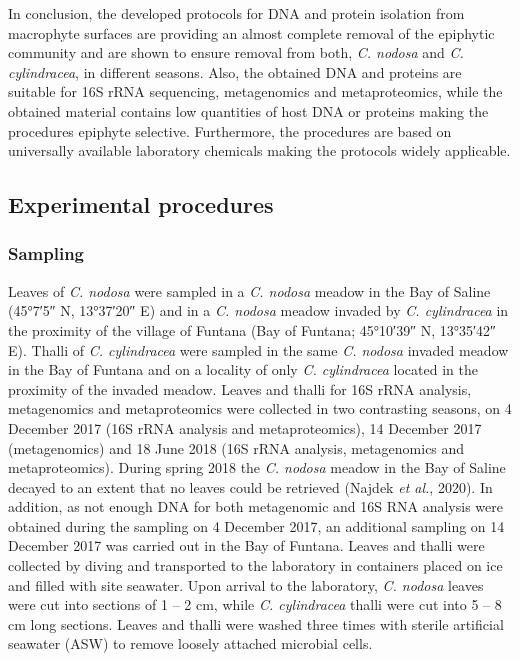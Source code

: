 \documentclass[
  12pt,
]{article}
\begin{document}
In conclusion, the developed protocols for DNA and protein isolation
from macrophyte surfaces are providing an almost complete removal of the
epiphytic community and are shown to ensure removal from both, \emph{C.
nodosa} and \emph{C. cylindracea}, in different seasons. Also, the
obtained DNA and proteins are suitable for 16S rRNA sequencing,
metagenomics and metaproteomics, while the obtained material contains
low quantities of host DNA or proteins making the procedures epiphyte
selective. Furthermore, the procedures are based on universally
available laboratory chemicals making the protocols widely applicable.

\newpage

\hypertarget{experimental-procedures}{%
\subsection{Experimental procedures}\label{experimental-procedures}}

\hypertarget{sampling}{%
\subsubsection{Sampling}\label{sampling}}

Leaves of \emph{C. nodosa} were sampled in a \emph{C. nodosa} meadow in
the Bay of Saline (\ang{45;7;5} N, \ang{13;37;20} E) and in a \emph{C.
nodosa} meadow invaded by \emph{C. cylindracea} in the proximity of the
village of Funtana (Bay of Funtana; \ang{45;10;39} N, \ang{13;35;42} E).
Thalli of \emph{C. cylindracea} were sampled in the same \emph{C.
nodosa} invaded meadow in the Bay of Funtana and on a locality of only
\emph{C. cylindracea} located in the proximity of the invaded meadow.
Leaves and thalli for 16S rRNA analysis, metagenomics and metaproteomics
were collected in two contrasting seasons, on 4 December 2017 (16S rRNA
analysis and metaproteomics), 14 December 2017 (metagenomics) and 18
June 2018 (16S rRNA analysis, metagenomics and metaproteomics). During
spring 2018 the \emph{C. nodosa} meadow in the Bay of Saline decayed to
an extent that no leaves could be retrieved (Najdek \emph{et al.},
2020). In addition, as not enough DNA for both metagenomic and 16S RNA
analysis were obtained during the sampling on 4 December 2017, an
additional sampling on 14 December 2017 was carried out in the Bay of
Funtana. Leaves and thalli were collected by diving and transported to
the laboratory in containers placed on ice and filled with site
seawater. Upon arrival to the laboratory, \emph{C. nodosa} leaves were
cut into sections of 1 -- 2 \si{\cm}, while \emph{C. cylindracea} thalli
were cut into 5 -- 8 \si{\cm} long sections. Leaves and thalli were
washed three times with sterile artificial seawater (ASW) to remove
loosely attached microbial cells.
\end{document}
